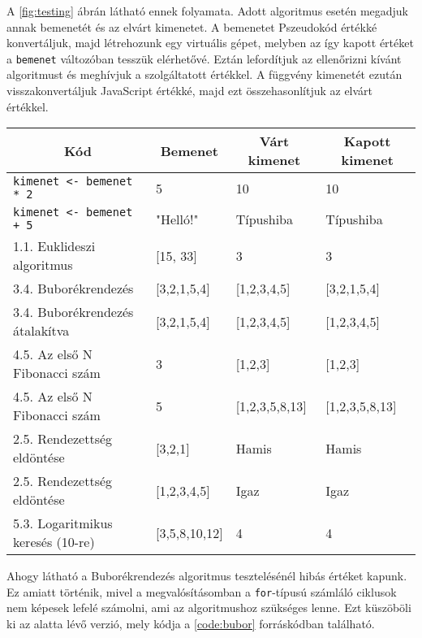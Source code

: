 
A \ref{fig:testing} ábrán látható ennek folyamata. Adott algoritmus esetén megadjuk annak bemenetét és az elvárt kimenetet. A bemenetet Pszeudokód értékké konvertáljuk, majd létrehozunk egy virtuális gépet, melyben az így kapott értéket a \texttt{bemenet} változóban tesszük elérhetővé. Eztán lefordítjuk az ellenőrizni kívánt algoritmust és meghívjuk a szolgáltatott értékkel. A függvény kimenetét ezután visszakonvertáljuk JavaScript értékké, majd ezt összehasonlítjuk az elvárt értékkel.

\minipage[t]{\linewidth}\vspace{-14pt}
\begin{center}
    \begin{tabularx}{\textwidth}{ l l X X }
        \hline
        \multicolumn{1}{c}{\bfseries{Kód}}  &
        \multicolumn{1}{c}{\bfseries{Bemenet}} &
        \multicolumn{1}{c}{\bfseries{Várt kimenet}} &
        \multicolumn{1}{c}{\bfseries{Kapott kimenet}}      \\

        \hline
        \texttt{kimenet <- bemenet * 2} & 5 & 10 & 10 \\
        \texttt{kimenet <- bemenet + 5} & "Helló!" & Típushiba & Típushiba \\
        1.1. Euklideszi algoritmus & [15, 33] & 3 & 3 \\
        3.4. Buborékrendezés & [3,2,1,5,4] & [1,2,3,4,5] & [3,2,1,5,4] \\
        3.4. Buborékrendezés átalakítva & [3,2,1,5,4] & [1,2,3,4,5] & [1,2,3,4,5] \\
        4.5. Az első N Fibonacci szám & 3 & [1,2,3] & [1,2,3] \\ 
        4.5. Az első N Fibonacci szám & 5 & [1,2,3,5,8,13] & [1,2,3,5,8,13] \\ 
        2.5. Rendezettség eldöntése & [3,2,1] & Hamis & Hamis \\
        2.5. Rendezettség eldöntése & [1,2,3,4,5] & Igaz & Igaz \\
        5.3. Logaritmikus keresés (10-re) & [3,5,8,10,12] & 4 & 4 \\
        \hline
    \end{tabularx}
\end{center}
\endminipage

Ahogy látható a Buborékrendezés algoritmus tesztelésénél hibás értéket kapunk. Ez amiatt történik, mivel a megvalósításomban a \texttt{for}-típusú számláló ciklusok nem képesek lefelé számolni, ami az algoritmushoz szükséges lenne. Ezt küszöböli ki az alatta lévő verzió, mely kódja a \ref{code:bubor} forráskódban található.


